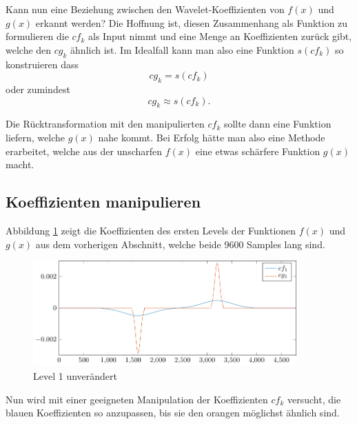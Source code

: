 Kann nun eine Beziehung zwischen den Wavelet-Koeffizienten von $f(x)$ und $g(x)$ erkannt werden?
Die Hoffnung ist, diesen Zusammenhang als Funktion zu formulieren die $cf_k$ als Input nimmt und eine Menge an Koeffizienten zurück gibt, welche den $cg_k$ ähnlich ist.
Im Idealfall kann man also eine Funktion $s(cf_k)$ so konstruieren dass
$$cg_k = s(cf_k)$$
oder zumindest
$$cg_k \approx s(cf_k).$$

Die Rücktransformation mit den manipulierten $cf_k$ sollte dann eine Funktion liefern, welche $g(x)$ nahe kommt.
Bei Erfolg hätte man also eine Methode erarbeitet, welche aus der \glqq unscharfen\grqq{} $f(x)$ eine etwas \glqq schärfere\grqq{} Funktion $g(x)$ macht. 

\subsection{Koeffizienten manipulieren}
Abbildung \ref{deconvolve:level1} zeigt die Koeffizienten des ersten Levels der Funktionen $f(x)$ und $g(x)$ aus dem vorherigen Abschnitt, welche beide 9600 Samples lang sind.
\begin{figure}[h]
\centering
\includegraphics[width=0.9\textwidth]{./papers/deconvolve/pictures/level/level1.pdf}
\caption{Level 1 unverändert\label{deconvolve:level1}}
\end{figure}

Nun wird mit einer geeigneten Manipulation der Koeffizienten $cf_k$ versucht, die blauen Koeffizienten so anzupassen, bis sie den orangen möglichst ähnlich sind.


